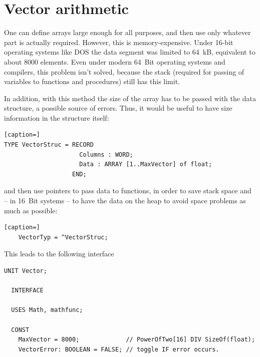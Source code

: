 \chapter{Vector arithmetic}
\begin{refsection}


One can define arrays large enough for all purposes, and then use only whatever part is actually required. However, this is memory-expensive. Under 16-bit operating systems like DOS the data segment was limited to \SI{64}{kB}, equivalent to about \num{8000} elements. Even under modern \SI{64}{Bit} operating systems and compilers, this problem isn't solved, because the stack (required for passing of variables to functions and procedures) still has this limit.

In addition, with this method the size of the array has to be passed with the data structure, a possible source of errors. Thus, it would be useful to have size information in the structure itself:

\begin{lstlisting}[caption=]
TYPE VectorStruc = RECORD
                     Columns : WORD;
                     Data : ARRAY [1..MaxVector] of float;
                   END;
\end{lstlisting}
and then use pointers to pass data to functions, in order to save stack space and -- in \SI{16}{Bit} systems -- to have the data on the heap to avoid space problems as much as possible:
\begin{lstlisting}[caption=]
    VectorTyp = ^VectorStruc;
\end{lstlisting}

This leads to the following interface
\begin{lstlisting}[caption=Interface of unit Vector]
  UNIT Vector;

  INTERFACE

  USES Math, mathfunc;

  CONST
    MaxVector = 8000;             // PowerOfTwo[16] DIV SizeOf(float);
    VectorError: BOOLEAN = FALSE; // toggle IF error occurs.



\end{lstlisting}
\end{refsection}
